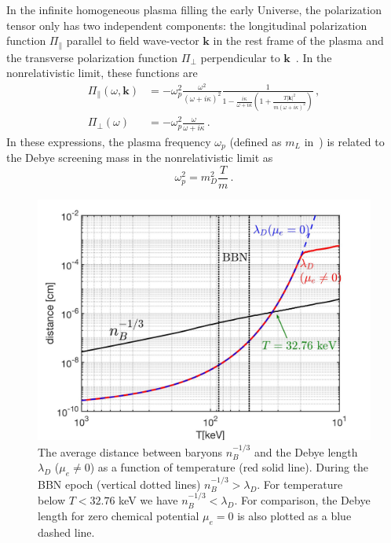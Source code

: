 In the infinite homogeneous plasma filling the early Universe, the polarization tensor only has two independent components: the longitudinal polarization function $\Pi_{\parallel}$ parallel to field wave-vector $\boldsymbol{k}$ in the rest frame of the plasma and the transverse polarization function $\Pi_{\perp}$ perpendicular to $\boldsymbol{k}$~\cite{melrose2008quantum}. In the nonrelativistic limit, these functions are~\cite{Formanek:2021blc}
\begin{align}\label{eq:polfuncs}
	\Pi_\parallel(\omega,\boldsymbol{k}) &= -\omega_p^2\frac{\omega^2}{(\omega+ i \kappa)^2} \frac{1}{1-\frac{i\kappa}{\omega+ i \kappa}\left(1+\frac{ T |\boldsymbol{k}|^2}{m (\omega+ i \kappa)^2} \right)}\,,\\
	\Pi_{\perp}(\omega) &= -\omega_p^2 \frac{\omega}{\omega+ i \kappa}\,.
\end{align}
In these expressions, the plasma frequency $\omega_p$ (defined as $m_L$ in~\cite{Formanek:2021blc}) is related to the Debye screening mass in the nonrelativistic limit as
\begin{equation}\label{eq:plasmafreq}
 \omega_p^2 = m_D^2\frac{T}{m}\,.
\end{equation}

\begin{figure} 
\centerline{\includegraphics[width=0.90\linewidth]{plots/chap03BBN/Distance_Plasma002.jpg}}
\caption{ The average distance between baryons $n_B^{-1/3}$ and the Debye length $\lambda_D$ ($\mu_e \neq 0$) as a function of temperature (red solid line). During the BBN epoch (vertical dotted lines) $n_B^{-1/3}>\lambda_D$. For temperature below $T<32.76$ keV we have $n_B^{-1/3}<\lambda_D$. For comparison, the Debye length for zero chemical potential $\mu_e=0$ is also plotted as a blue dashed line. }
\label{MeanFreePath_fig} 
\end{figure}

